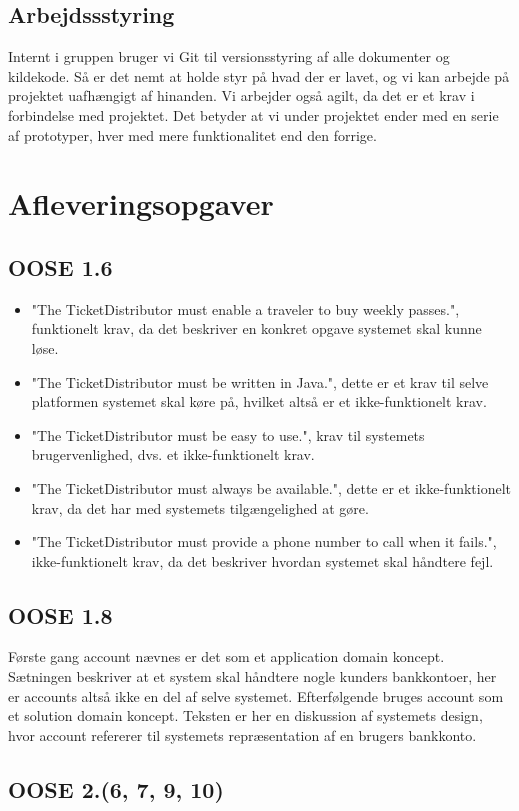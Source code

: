 \documentclass[12pt]{article}
\begin{document}
\subsection{Arbejdssstyring}
Internt i gruppen bruger vi Git til versionsstyring af alle dokumenter og kildekode. Så er det nemt at holde styr på hvad der er lavet, og vi kan arbejde på projektet uafhængigt af hinanden. Vi arbejder også agilt, da det er et krav i forbindelse med projektet. Det betyder at vi under projektet ender med en serie af prototyper, hver med mere funktionalitet end den forrige.

\section{Afleveringsopgaver}
\subsection{OOSE 1.6}
\begin{itemize}
\item "The TicketDistributor must enable a traveler to buy weekly passes.",	funktionelt krav, da det beskriver en konkret opgave systemet skal kunne løse.
\item "The TicketDistributor must be written in Java.", dette er et krav til selve platformen systemet skal køre på, hvilket altså er et ikke-funktionelt krav.
\item "The TicketDistributor must be easy to use.", krav til systemets brugervenlighed, dvs. et ikke-funktionelt krav.
\item "The TicketDistributor must always be available.", dette er et ikke-funktionelt krav, da det har med systemets tilgængelighed at gøre.
\item "The TicketDistributor must provide a phone number to call when it fails.", ikke-funktionelt krav, da det beskriver hvordan systemet skal håndtere fejl.
\end{itemize}
\subsection{OOSE 1.8}
Første gang account nævnes er det som et application domain koncept. Sætningen beskriver at et system skal håndtere nogle kunders bankkontoer, her er accounts altså ikke en del af selve systemet. Efterfølgende bruges account som et solution domain koncept. Teksten er her en diskussion af systemets design, hvor account refererer til systemets repræsentation af en brugers bankkonto.
\subsection{OOSE 2.(6, 7, 9, 10)}
\end{document}
